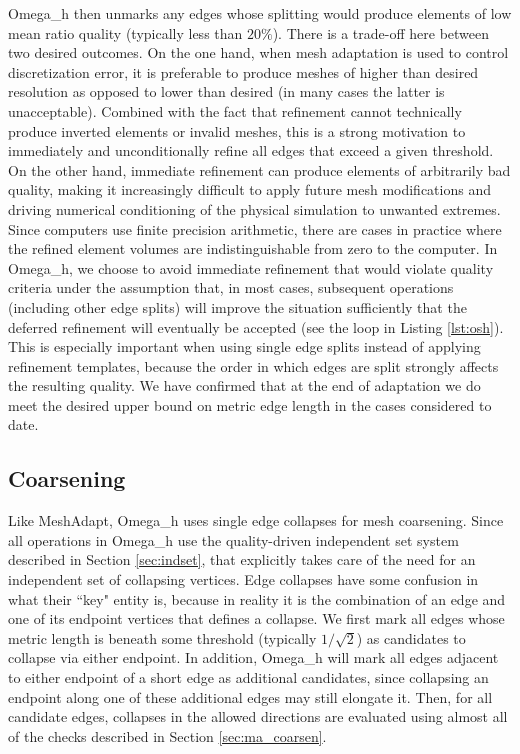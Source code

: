 Omega\_h then unmarks any edges whose splitting
would produce elements of low mean ratio quality (typically less than $20\%$).
There is a trade-off here between two desired outcomes.
On the one hand, when mesh adaptation is used to control discretization
error, it is preferable to produce meshes of higher than desired resolution
as opposed to lower than desired (in many cases the latter is unacceptable).
Combined with the fact that refinement cannot technically produce
inverted elements or invalid meshes, this is a strong motivation to immediately
and unconditionally refine all edges that exceed a given threshold.
On the other hand, immediate refinement can produce elements of arbitrarily
bad quality, making it increasingly difficult to apply future mesh modifications
and driving numerical conditioning of the physical simulation to unwanted extremes.
Since computers use finite precision arithmetic, there are cases in practice
where the refined element volumes are indistinguishable from zero to the computer.
In Omega\_h, we choose to avoid immediate refinement that would violate
quality criteria under the assumption that, in most cases, subsequent
operations (including other edge splits) will improve the situation
sufficiently that the deferred refinement will eventually be accepted
(see the loop in Listing \ref{lst:osh}).
This is especially important when using single edge splits instead of
applying refinement templates, because the order in which edges are split
strongly affects the resulting quality.
We have confirmed that at the end of adaptation we do meet the desired
upper bound on metric edge length in the cases considered to date.

\subsection{Coarsening}
\label{sec:osh_coarsen}

Like MeshAdapt, Omega\_h uses single edge collapses
for mesh coarsening.
Since all operations in Omega\_h use the quality-driven
independent set system described in Section \ref{sec:indset},
that explicitly takes care of the need for an independent
set of collapsing vertices.
Edge collapses have some confusion in what their ``key" entity is,
because in reality it is the combination of an edge and one
of its endpoint vertices that defines a collapse.
We first mark all edges whose metric length is beneath
some threshold (typically $1/\sqrt{2}$) as candidates to collapse
via either endpoint.
In addition, Omega\_h will mark all edges adjacent to either endpoint
of a short edge as additional candidates, since collapsing an endpoint
along one of these additional edges may still elongate it.
Then, for all candidate edges, collapses in the allowed directions are evaluated
using almost all of the checks described in Section \ref{sec:ma_coarsen}.

